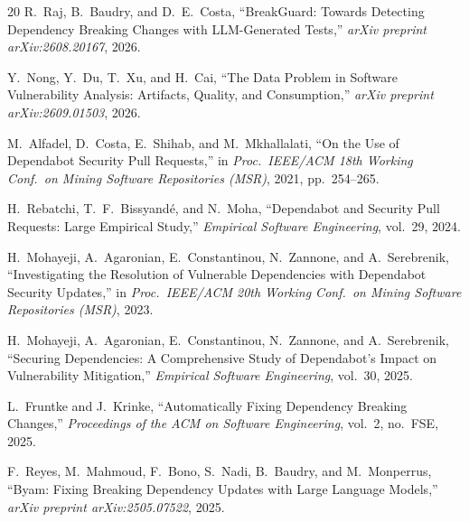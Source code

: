 \documentclass[10pt,journal]{IEEEtran}
\begin{document}
\begin{thebibliography}{20}
R.~Raj, B.~Baudry, and D.~E.~Costa, ``BreakGuard: Towards Detecting Dependency Breaking Changes with LLM-Generated Tests,'' \emph{arXiv preprint arXiv:2608.20167}, 2026.

Y.~Nong, Y.~Du, T.~Xu, and H.~Cai, ``The Data Problem in Software Vulnerability Analysis: Artifacts, Quality, and Consumption,'' \emph{arXiv preprint arXiv:2609.01503}, 2026.

M.~Alfadel, D.~Costa, E.~Shihab, and M.~Mkhallalati, ``On the Use of Dependabot Security Pull Requests,'' in \emph{Proc.\ IEEE/ACM 18th Working Conf.\ on Mining Software Repositories (MSR)}, 2021, pp.\ 254--265.

H.~Rebatchi, T.~F.~Bissyand{\'e}, and N.~Moha, ``Dependabot and Security Pull Requests: Large Empirical Study,'' \emph{Empirical Software Engineering}, vol.\ 29, 2024.

H.~Mohayeji, A.~Agaronian, E.~Constantinou, N.~Zannone, and A.~Serebrenik, ``Investigating the Resolution of Vulnerable Dependencies with Dependabot Security Updates,'' in \emph{Proc.\ IEEE/ACM 20th Working Conf.\ on Mining Software Repositories (MSR)}, 2023.

H.~Mohayeji, A.~Agaronian, E.~Constantinou, N.~Zannone, and A.~Serebrenik, ``Securing Dependencies: A Comprehensive Study of Dependabot's Impact on Vulnerability Mitigation,'' \emph{Empirical Software Engineering}, vol.\ 30, 2025.

L.~Fruntke and J.~Krinke, ``Automatically Fixing Dependency Breaking Changes,'' \emph{Proceedings of the ACM on Software Engineering}, vol.\ 2, no.\ FSE, 2025.

F.~Reyes, M.~Mahmoud, F.~Bono, S.~Nadi, B.~Baudry, and M.~Monperrus, ``Byam: Fixing Breaking Dependency Updates with Large Language Models,'' \emph{arXiv preprint arXiv:2505.07522}, 2025.
\end{thebibliography}
\end{document}
